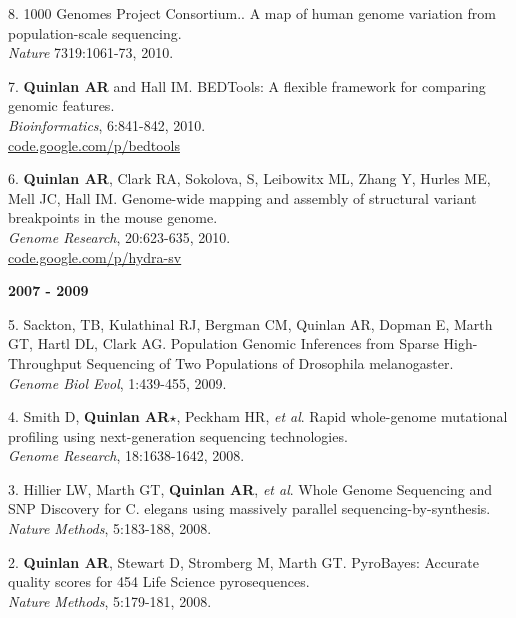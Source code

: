 \documentclass[margin,line]{cv}
\begin{document}
\begin{resume}
\begin{list}{*}{}
    \item[8.] 1000 Genomes Project Consortium.. 
    A map of human genome variation from population-scale sequencing.\\ 
    \textit{Nature} 7319:1061-73, 2010.

    \item[7.] \textbf{Quinlan AR} and Hall IM.
    BEDTools: A flexible framework for comparing genomic features.\\ 
    \textit{Bioinformatics}, 6:841-842, 2010.\\
    \url{code.google.com/p/bedtools}

    \item[6.] \textbf{Quinlan AR}, Clark RA, Sokolova, S, Leibowitx ML, Zhang Y, Hurles ME, Mell JC, Hall IM. 
    Genome-wide mapping and assembly of structural variant breakpoints in the mouse genome.\\
    \textit{Genome Research}, 20:623-635, 2010.\\
    \url{code.google.com/p/hydra-sv}
    
    \end{list}
    

    \textbf{2007 - 2009} \\
    \begin{list}{*}{}

    \item[5.] Sackton, TB, Kulathinal RJ, Bergman CM, Quinlan AR, Dopman E, Marth GT, Hartl DL, Clark AG. 
    Population Genomic Inferences from Sparse High-Throughput Sequencing of Two Populations of Drosophila melanogaster.\\
    \textit{Genome Biol Evol}, 1:439-455, 2009.

    \item[4.] Smith D, \textbf{Quinlan AR}$\star$, Peckham HR, \textit{et al}. 
    Rapid whole-genome mutational profiling using next-generation sequencing technologies.\\
    \textit{Genome Research}, 18:1638-1642, 2008.

    \item[3.] Hillier LW, Marth GT, \textbf{Quinlan AR}, \textit{et al}. 
    Whole Genome Sequencing and SNP Discovery for C. elegans using massively parallel sequencing-by-synthesis.\\
    \textit{Nature Methods}, 5:183-188, 2008.
    
    \item[2.] \textbf{Quinlan AR}, Stewart D, Stromberg M, Marth GT. 
    PyroBayes: Accurate quality scores for 454 Life Science pyrosequences.\\
    \textit{Nature Methods}, 5:179-181, 2008.
    

\end{list}
\end{resume}
\end{document}

